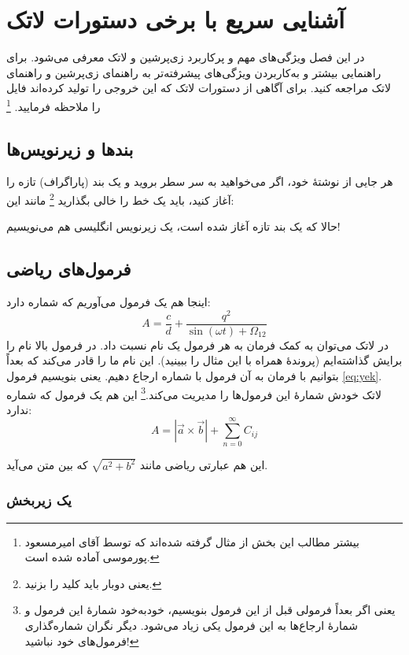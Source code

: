 
\chapter{آشنایی سریع با برخی دستورات لاتک}
\label{app:latexIntro}
در این فصل ویژگی‌های مهم و پرکاربرد زی‌پرشین و لاتک معرفی می‌شود. برای راهنمایی بیشتر و به‌کاربردن ویژگی‌های پیشرفته‌تر به راهنمای زی‌پرشین و راهنمای لاتک مراجعه کنید. برای آگاهی از دستورات لاتک که این خروجی را تولید کرده‌اند فایل  را ملاحظه فرمایید.
\footnote{بیشتر مطالب این بخش از مثال 
گرفته شده‌اند که توسط آقای امیرمسعود پورموسی آماده شده است.}

\section{بندها و زیرنویس‌ها}
هر جایی از نوشتهٔ خود، اگر می‌خواهید به سر سطر بروید و یک بند (پاراگراف) تازه را آغاز کنید، باید یک خط را خالی بگذارید%
\footnote{یعنی دوبار باید کلید  را بزنید.}
 مانند این:

حالا که یک بند تازه آغاز شده است، یک زیرنویس انگلیسی%
 هم می‌نویسیم!
\section{فرمول‌های ریاضی}
\label{formula}

اینجا هم یک فرمول می‌آوریم که شماره دارد:
\begin{equation}\label{eq:yek}
A=\frac{c}{d}+\frac{q^2}{\sin(\omega t)+\Omega_{12}}
\end{equation}
در لاتک می‌توان به کمک فرمان 
به هر فرمول یک نام نسبت داد. در فرمول بالا نام  را برایش گذاشته‌ایم (پروندهٔ  همراه با این مثال را ببینید). این نام ما را قادر می‌کند که بعداً بتوانیم با فرمان
به آن فرمول با شماره ارجاع دهیم. یعنی بنویسیم فرمول \ref{eq:yek}. 
لاتک خودش شمارهٔ این فرمول‌ها را مدیریت می‌کند.\footnote{یعنی اگر بعداً فرمولی قبل از این فرمول بنویسیم، خودبه‌خود شمارهٔ این فرمول و شمارهٔ ارجاع‌ها به این فرمول یکی زیاد می‌شود. دیگر نگران شماره‌گذاری فرمول‌های خود نباشید!} این هم یک فرمول که شماره ندارد:
$$A=|\vec{a}\times \vec{b}| + \sum_{n=0}^\infty C_{ij}$$

این هم عبارتی ریاضی مانند 
$\sqrt{a^2+b^2}$
 که بین متن می‌آید.
\subsection{یک زیربخش}
\label{zirbakhsh}

